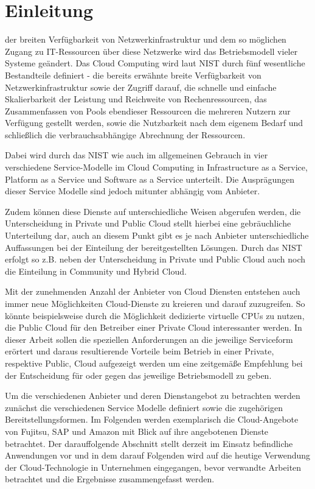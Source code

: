 \section{Einleitung}
\label{sec_introduction}

 der breiten Verfügbarkeit von Netzwerkinfrastruktur und dem so möglichen Zugang zu IT-Ressourcen über diese Netzwerke wird das Betriebsmodell vieler Systeme geändert. Das Cloud Computing wird laut NIST durch fünf wesentliche Bestandteile definiert - die bereits erwähnte breite Verfügbarkeit von Netzwerkinfrastruktur sowie der Zugriff darauf, die schnelle und einfache Skalierbarkeit der Leistung und Reichweite von Rechenressourcen, das Zusammenfassen von Pools ebendieser Ressourcen die mehreren Nutzern zur Verfügung gestellt werden, sowie die Nutzbarkeit nach dem eigenem Bedarf und schließlich die verbrauchsabhängige Abrechnung der Ressourcen.

Dabei wird durch das NIST wie auch im allgemeinen Gebrauch in vier verschiedene Service-Modelle im Cloud Computing in Infrastructure as a Service, Platform as a Service und Software as a Service unterteilt. Die Ausprägungen dieser Service Modelle sind jedoch mitunter abhängig vom Anbieter.

Zudem können diese Dienste auf unterschiedliche Weisen abgerufen werden, die Unterscheidung in Private und Public Cloud stellt hierbei eine gebräuchliche Unterteilung dar, auch an diesem Punkt gibt es je nach Anbieter unterschiedliche Auffassungen bei der Einteilung der bereitgestellten Lösungen. Durch das NIST erfolgt so z.B. neben der Unterscheidung in Private und Public Cloud auch noch die Einteilung in Community und Hybrid Cloud. \cite{nistStandards}

Mit der zunehmenden Anzahl der Anbieter von Cloud Diensten entstehen auch immer neue Möglichkeiten Cloud-Dienste zu kreieren und darauf zuzugreifen. So könnte beispielsweise durch die Möglichkeit dedizierte virtuelle CPUs zu nutzen, die Public Cloud für den Betreiber einer Private Cloud interessanter werden. In dieser Arbeit sollen die speziellen Anforderungen an die jeweilige Serviceform erörtert und daraus resultierende Vorteile beim Betrieb in einer Private, respektive Public, Cloud aufgezeigt werden um eine zeitgemäße Empfehlung bei der Entscheidung für oder gegen das jeweilige Betriebsmodell zu geben. 

Um die verschiedenen Anbieter und deren Dienstangebot zu betrachten werden zunächst die verschiedenen Service Modelle definiert sowie die zugehörigen Bereitstellungsformen. Im Folgenden werden exemplarisch die Cloud-Angebote von Fujitsu, SAP und Amazon mit Blick auf ihre angebotenen Dienste betrachtet. Der darauffolgende Abschnitt stellt derzeit im Einsatz befindliche Anwendungen vor und in dem darauf Folgenden wird auf die heutige Verwendung der Cloud-Technologie in Unternehmen eingegangen, bevor verwandte Arbeiten betrachtet und die Ergebnisse zusammengefasst werden.
